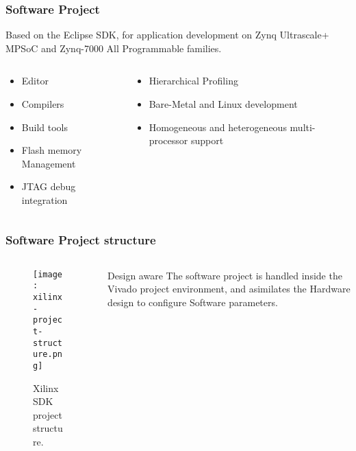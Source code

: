 \begin{frame}
	\frametitle{Software Project}
	Based on the Eclipse SDK, for application development on Zynq Ultrascale+ MPSoC and Zynq-7000 All Programmable families.
	\vfill
	\begin{columns}
		\begin{column}{0.5\textwidth}
			\begin{itemize}
				\item Editor
				\item Compilers
				\item Build tools
				\item Flash memory Management
				\item JTAG debug integration
			\end{itemize}
		\end{column}
		\begin{column}{0.5\textwidth}
			\begin{itemize}
				\item Hierarchical Profiling
				\item Bare-Metal and Linux development
				\item Homogeneous and heterogeneous multi-processor support
			\end{itemize}
		\end{column}
	\end{columns}
\end{frame}

\begin{frame}
	\frametitle{Software Project structure}
	\begin{columns}
		\begin{column}{0.5\textwidth}
			\begin{figure}
				\texttt{[image: xilinx-project-structure.png]}
				\caption{Xilinx SDK project structure.}\label{fig:xilinx-project-structure}
			\end{figure}
		\end{column}
		\begin{column}{0.5\textwidth}
			\begin{block}{Design aware}
				The software project is handled inside the Vivado project environment, and asimilates the Hardware design to configure Software parameters.
			\end{block}
		\end{column}
	\end{columns}
\end{frame}


